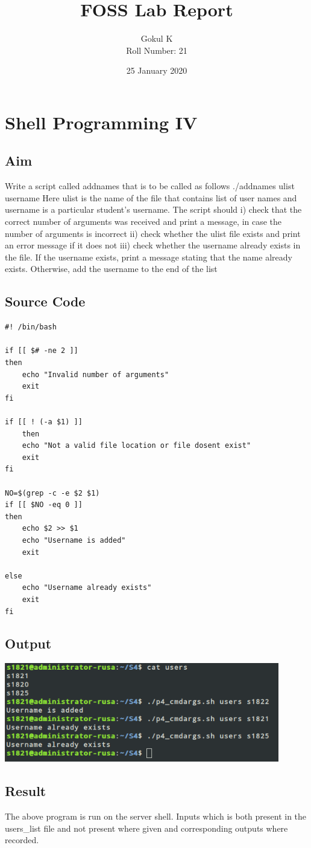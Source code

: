 \documentclass{article}
\begin{document}
\title{FOSS Lab Report}
\author{Gokul K\\[2\baselineskip]
Roll Number: 21\\[2\baselineskip]}
\date{25 January 2020}

\maketitle

\setcounter{section}{6}
\section{Shell Programming IV}
\subsection{Aim}
Write a script called addnames that is to be called as follows ./addnames ulist username
Here ulist is the name of the file that contains list of user names and username is a
particular student’s username. The script should
   i) check that the correct number of arguments was received and print a message, in
    case the number of arguments is incorrect
   ii) check whether the ulist file exists and print an error message if it does not
   iii) check whether the username already exists in the file. If the username exists, print a message stating that the name already exists. Otherwise, add the username to the end of the list

\subsection{Source Code}
\begin{verbatim}
#! /bin/bash

if [[ $# -ne 2 ]]
then
	echo "Invalid number of arguments"
	exit
fi

if [[ ! (-a $1) ]]
	then
	echo "Not a valid file location or file dosent exist"
	exit
fi

NO=$(grep -c -e $2 $1)
if [[ $NO -eq 0 ]]
then
	echo $2 >> $1
	echo "Username is added"
	exit

else
	echo "Username already exists"
	exit
fi
\end{verbatim}

\subsection{Output}
\includegraphics[width=0.9\textwidth]{img/p7/ss.png}\newline

\subsection{Result}
The above program is run on the server shell. Inputs which is both present in the users_list file and not present where given and corresponding outputs where recorded.
\end{document}
